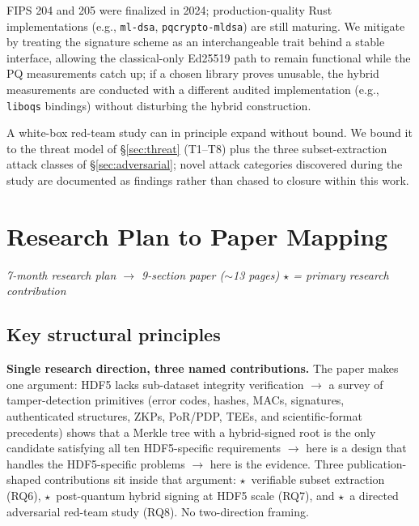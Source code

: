 \documentclass[11pt]{article}
\begin{document}
\begin{description}[nosep]
  \item[Cryptographic agility risk for ML-DSA / SLH-DSA.] FIPS 204 and 205
    were finalized in 2024; production-quality Rust implementations
    (e.g., \texttt{ml-dsa}, \texttt{pqcrypto-mldsa}) are still maturing.
    We mitigate by treating the signature scheme as an
    interchangeable trait behind a stable interface, allowing the
    classical-only Ed25519 path to remain functional while the PQ
    measurements catch up; if a chosen library proves unusable, the hybrid
    measurements are conducted with a different audited implementation
    (e.g., \texttt{liboqs} bindings) without disturbing the hybrid
    construction.
  \item[Adversarial-study scope.] A white-box red-team study can in principle
    expand without bound. We bound it to the threat model of
    \S\ref{sec:threat} (T1--T8) plus the three subset-extraction attack
    classes of \S\ref{sec:adversarial}; novel attack categories discovered
    during the study are documented as findings rather than chased to
    closure within this work.
\end{description}

\newpage
\section*{\textcolor{blue!60!black}{Research Plan to Paper Mapping}}
\label{sec:mapping}

\begin{center}
\textit{7-month research plan $\rightarrow$ 9-section paper ($\sim$13 pages) \quad
$\star$ = primary research contribution}
\end{center}

\subsection*{\textcolor{blue!60!black}{Key structural principles}}

\textbf{Single research direction, three named contributions.}
The paper makes one argument:
HDF5 lacks sub-dataset integrity verification
$\rightarrow$ a survey of tamper-detection primitives (error codes, hashes, MACs,
signatures, authenticated structures, ZKPs, PoR/PDP, TEEs, and scientific-format
precedents) shows that a Merkle tree with a hybrid-signed root is the only candidate
satisfying all ten HDF5-specific requirements
$\rightarrow$ here is a design that handles the HDF5-specific problems
$\rightarrow$ here is the evidence.
Three publication-shaped contributions sit inside that argument:
$\star$~verifiable subset extraction (RQ6),
$\star$~post-quantum hybrid signing at HDF5 scale (RQ7), and
$\star$~a directed adversarial red-team study (RQ8).
No two-direction framing.
\end{document}
